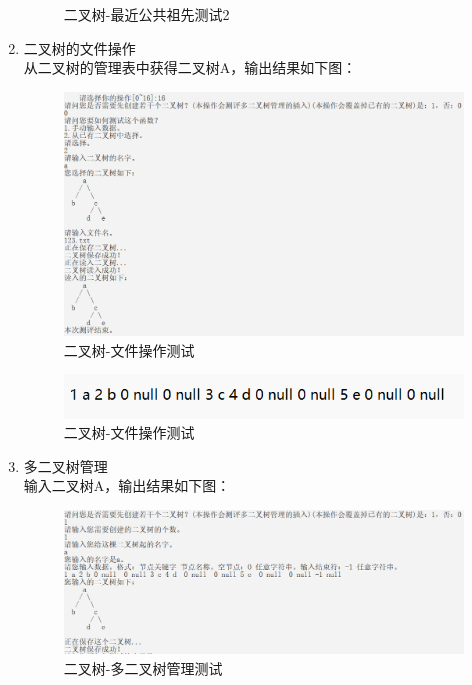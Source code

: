 \documentclass[supercite]{Experimental_Report}
\theoremstyle{definition}
\begin{document}
\begin{enumerate}
\begin{figure}[htb]
\begin{center}
				\caption{二叉树-最近公共祖先测试2}
				\label{fig2-15.2}
			\end{center}
		\end{figure}
		\newpage
	\item 二叉树的文件操作\\
	从二叉树的管理表中获得二叉树A，输出结果如下图：
		\begin{figure}[htb]
			\begin{center}
				\includegraphics[scale=0.50]{images/二叉树-文件操作.png}
				\caption{二叉树-文件操作测试}
				\label{fig2-16.1}
			\end{center}
		\end{figure}
		\begin{figure}[htb]
			\begin{center}
				\includegraphics[scale=1.50]{images/二叉树-文件.png}
				\caption{二叉树-文件操作测试}
				\label{fig2-16.2}
			\end{center}
		\end{figure}
		\newpage
		\item 多二叉树管理\\
		输入二叉树A，输出结果如下图：
		\begin{figure}[htb]
			\begin{center}
				\includegraphics[scale=0.50]{images/二叉树-多二叉树管理.png}
				\caption{二叉树-多二叉树管理测试}
				\label{fig2-17}
			\end{center}
		\end{figure}
\end{enumerate}
\end{document}
